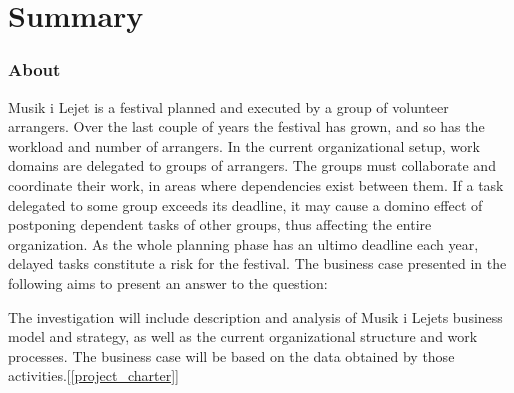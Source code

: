 \part{Summary}

\section{About}
Musik i Lejet is a festival planned and executed by a group of volunteer arrangers. Over the last
couple of years the festival has grown, and so has the workload and number of arrangers. In the
current organizational setup, work domains are delegated to groups of arrangers. The groups must
collaborate and coordinate their work, in areas where dependencies exist between them. If a task
delegated to some group exceeds its deadline, it may cause a domino effect of postponing dependent
tasks of other groups, thus affecting the entire organization. As the whole planning phase has an ultimo deadline each year, delayed tasks constitute a risk for the festival. The business case presented in the following aims to present an answer to the question:
\vspace{1pt}
\begin{center}
\end{center}
\vspace{1pt}
\noindent
The investigation will include description and analysis of Musik i Lejets business model and strategy, as well as the current organizational structure and work processes. The business case will be based on the data obtained by those activities.[\ref{project_charter}]

